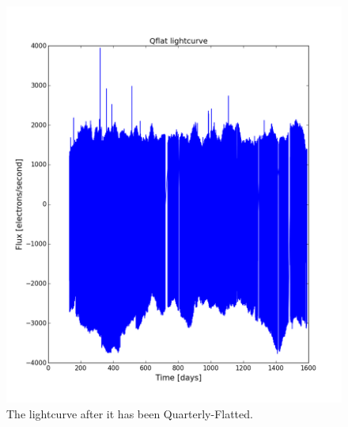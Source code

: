 \documentclass[12pt]{article}
\begin{document}
\begin{figure}
    \includegraphics[width=\textwidth]{Qflat_lightcurve.png}
    \caption{The lightcurve after it has been Quarterly-Flatted.}
    \label{fig:Q_lc}
    
\end{figure}
\end{document}
